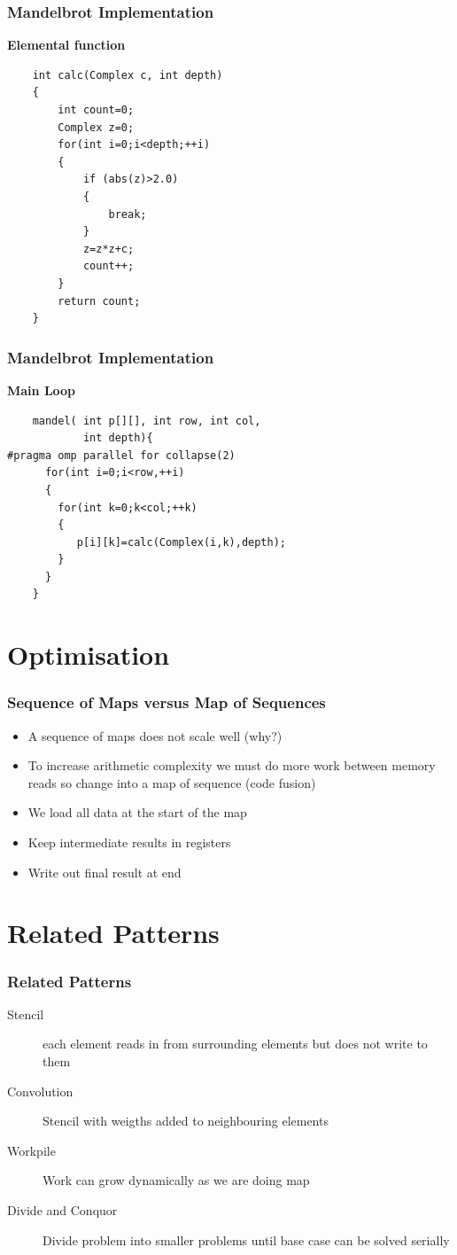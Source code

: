 \documentclass{beamer}
\begin{document}
\begin{frame}[fragile=singleslide]
	\frametitle{Mandelbrot Implementation}
	
	\textbf{Elemental function}
	\begin{lstlisting}
	int calc(Complex c, int depth)
	{
		int count=0;
		Complex z=0;
		for(int i=0;i<depth;++i)
		{
			if (abs(z)>2.0)
			{
				break;
			}
			z=z*z+c;
			count++;
		}
		return count;
	}
	\end{lstlisting}
\end{frame}

\begin{frame}[fragile=singleslide]
	\frametitle{Mandelbrot Implementation}
	
	\textbf{Main Loop}
	\begin{lstlisting}
	mandel( int p[][], int row, int col, 
	        int depth){
#pragma omp parallel for collapse(2)	  
	  for(int i=0;i<row,++i)
	  {
        for(int k=0;k<col;++k)
		{
	       p[i][k]=calc(Complex(i,k),depth);
		}
	  }
	}
	\end{lstlisting}
\end{frame}

\section{Optimisation}
\begin{frame}
	\frametitle{Sequence of Maps versus Map of Sequences}
\begin{itemize}
	\item A sequence of maps does not scale well (why?)
	\item To increase arithmetic complexity we must do more work between memory reads
so change into a  map of sequence (code fusion)
	\item We load all data at the start of the map
	\item Keep intermediate results in registers
	\item Write out final result at end
\end{itemize}
\end{frame}
\section{Related Patterns}
\begin{frame}
	\frametitle{Related Patterns}
\begin{description}
	\item[Stencil] each element reads in from surrounding elements but does not write to them
	\item[Convolution]	Stencil with weigths added to neighbouring elements
	\item[Workpile]	Work can grow dynamically as we are doing map
	\item[Divide and Conquor] Divide problem into smaller problems until base case can be solved serially
\end{description}
\end{frame}
 
 
 
 
\end{document}

